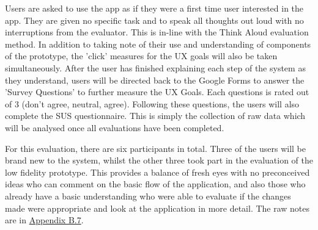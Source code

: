 \documentclass[a4 paper, 12pt]{article}
\begin{document}
    Users are asked to use the app as if they were a first time user interested in the app. They are given no specific task and to speak all thoughts out loud with no interruptions from the evaluator. This is in-line with the Think Aloud evaluation method. In addition to taking note of their use and understanding of components of the prototype, the 'click' measures for the UX goals will also be taken simultaneously. After the user has finished explaining each step of the system as they understand, users will be directed back to the Google Forms to answer the 'Survey Questions' to further measure the UX Goals. Each questions is rated out of 3 (don't agree, neutral, agree). Following these questions, the users will also complete the SUS questionnaire. This is simply the collection of raw data which will be analysed once all evaluations have been completed.
  
    For this evaluation, there are six participants in total. Three of the users will be brand new to the system, whilst the other three took part in the evaluation of the low fidelity prototype. This provides a balance of fresh eyes with no preconceived ideas who can comment on the basic flow of the application, and also those who already have a basic understanding who were able to evaluate if the changes made were appropriate and look at the application in more detail. The raw notes are in \hyperref[sec:B.7]{Appendix B.7}. 
\end{document}
